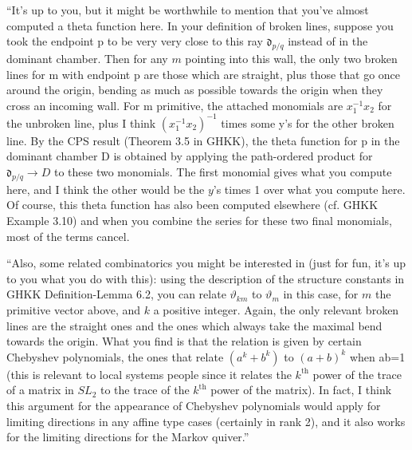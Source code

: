 \documentclass{amsart}
\theoremstyle{definition}
\theoremstyle{remark}
\numberwithin{equation}{section}
\newcommand{\thet}{\vartheta}
\newcommand{\0}{{\mathbf{0}}}
\renewcommand{\d}{{\mathfrak d}}
\begin{document}
``It's up to you, but it might be worthwhile to mention that you've almost computed a theta function here.  In your definition of broken lines, suppose you took the endpoint p to be very very close to this ray $\d_{p/q}$ instead of in the dominant chamber.  Then for any $m$ pointing into this wall, the only two broken lines for m with endpoint p are those which are straight, plus those that go once around the origin, bending as much as possible towards the origin when they cross an incoming wall.  For m primitive, the attached monomials are $x_1^{-1}x_2$ for the unbroken line, plus I think $(x_1^{-1}x_2)^{-1}$ times some y's for the other broken line.  By the CPS result (Theorem 3.5 in GHKK), the theta function for p in the dominant chamber D is obtained by applying the path-ordered product for $\d_{p/q}\to D$ to these two monomials.  The first monomial gives what you compute here, and I think the other would be the $y$'s times 1 over what you compute here.  Of course, this theta function has also been computed elsewhere (cf. GHKK Example 3.10) and when you combine the series for these two final monomials, most of the terms cancel.

``Also, some related combinatorics you might be interested in (just for fun, it's up to you what you do with this): using the description of the structure constants in GHKK Definition-Lemma 6.2, you can relate $\thet_{km}$ to $\thet_m$ in this case, for $m$ the primitive vector above, and $k$ a positive integer.  Again, the only relevant broken lines are the straight ones and the ones which always take the maximal bend towards the origin.  What you find is that the relation is given by certain Chebyshev polynomials, the ones that relate $(a^k+b^k)$ to $(a+b)^k$ when ab=1 (this is relevant to local systems people since it relates the $k^{\text{th}}$ power of the trace of a matrix in $SL_2$ to the trace of the $k^{\text{th}}$ power of the matrix).  In fact, I think this argument for the appearance of Chebyshev polynomials would apply for limiting directions in any affine type cases (certainly in rank 2), and it also works for the limiting directions for the Markov quiver.''
\end{document}
